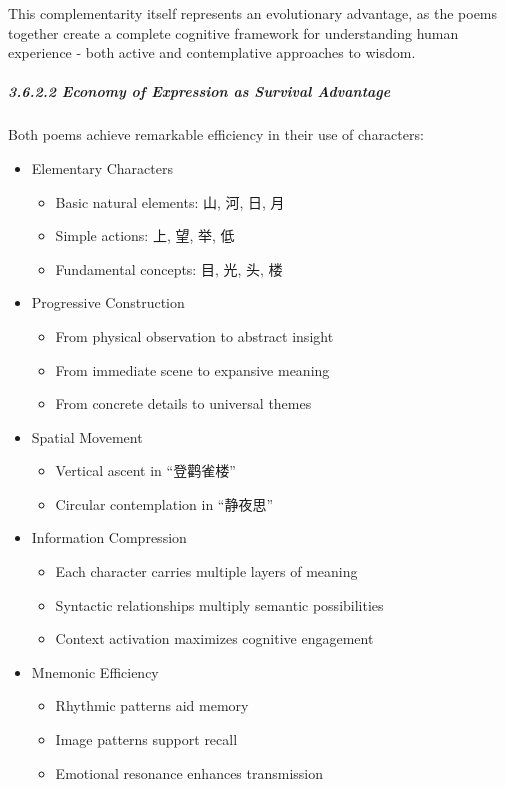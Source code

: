 \documentclass[
  11pt,
  letterpaper,
]{article}
\providecommand{\tightlist}{%
  \setlength{\itemsep}{0pt}\setlength{\parskip}{0pt}}
\begin{document}
This complementarity itself represents an evolutionary advantage, as the
poems together create a complete cognitive framework for understanding
human experience - both active and contemplative approaches to wisdom.

\subparagraph{3.6.2.2 Economy of Expression as Survival
Advantage}\label{economy-of-expression-as-survival-advantage}

Both poems achieve remarkable efficiency in their use of characters:

\begin{itemize}
\tightlist
\item
  Elementary Characters

  \begin{itemize}
  \tightlist
  \item
    Basic natural elements: 山, 河, 日, 月
  \item
    Simple actions: 上, 望, 举, 低
  \item
    Fundamental concepts: 目, 光, 头, 楼
  \end{itemize}
\item
  Progressive Construction

  \begin{itemize}
  \tightlist
  \item
    From physical observation to abstract insight
  \item
    From immediate scene to expansive meaning
  \item
    From concrete details to universal themes
  \end{itemize}
\item
  Spatial Movement

  \begin{itemize}
  \tightlist
  \item
    Vertical ascent in ``登鹳雀楼''
  \item
    Circular contemplation in ``静夜思''
  \end{itemize}
\item
  Information Compression

  \begin{itemize}
  \tightlist
  \item
    Each character carries multiple layers of meaning
  \item
    Syntactic relationships multiply semantic possibilities
  \item
    Context activation maximizes cognitive engagement
  \end{itemize}
\item
  Mnemonic Efficiency

  \begin{itemize}
  \tightlist
  \item
    Rhythmic patterns aid memory
  \item
    Image patterns support recall
  \item
    Emotional resonance enhances transmission
  \end{itemize}
\end{itemize}
\end{document}
